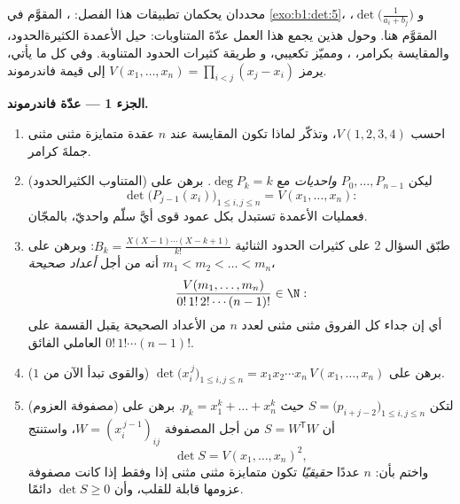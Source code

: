 \begin{problem}\label{pb:b1:det:1}
محددان يحكمان تطبيقات هذا الفصل: ، المقوَّم في \cref{exo:b1:det:5}، و
\emph{} $\det\bigl(\frac{1}{a_i +
b_j}\bigr)$، المقوَّم هنا. وحول هذين يجمع هذا العمل
عدّةَ المتناوبات: حيل الأعمدة الكثيرةالحدود، والمقايسة
بكرامر، ، ومميّز  تكعيبي، و
طريقة كثيرات الحدود المتناوبة. وفي كل ما يأتي، يرمز $V(x_1,
\dots, x_n) = \prod_{i < j}(x_j - x_i)$ إلى قيمة
فاندرموند.

\medskip
\noindent\textbf{الجزء 1 --- عدّة فاندرموند.}
\begin{enumerate}
  \item احسب $V(1, 2, 3, 4)$، وتذكّر لماذا تكون المقايسة عند
        $n$ عقدة متمايزة مثنى مثنى جملةَ كرامر.
  \item (المتناوب الكثيرالحدود) ليكن $P_0, \dots, P_{n-1}$
        \emph{واحديات} مع $\deg P_k = k$. برهن على
        \[
        \det\bigl(P_{j-1}(x_i)\bigr)_{1 \leq i, j \leq n}
        = V(x_1, \dots, x_n) :
        \]
        فعمليات الأعمدة تستبدل بكل عمود قوى أيَّ سلّم
        واحديّ، بالمجّان.
  \item طبّق السؤال 2 على كثيرات الحدود الثنائية $B_k =
        \frac{X(X-1)\cdots(X-k+1)}{k!}$: وبرهن على أنه من أجل
        \emph{أعداد صحيحة} $m_1 < m_2 < \dots < m_n$،
        \[
        \frac{V(m_1, \dots, m_n)}{0!\,1!\,2!\cdots(n-1)!}
        \in \N :
        \]
        أي إن جداء كل الفروق مثنى مثنى لعدد $n$ من الأعداد الصحيحة
        يقبل القسمة على العاملي الفائق $0!\,1!\cdots(n-1)!$.
  \item برهن على $\det\bigl(x_i^{\,j}\bigr)_{1 \leq i, j \leq n} =
        x_1 x_2 \cdots x_n\, V(x_1, \dots, x_n)$ (والقوى تبدأ
        الآن من $1$).
  \item (مصفوفة العزوم) لتكن $S = \bigl(p_{i+j-2}\bigr)_{1 \leq
        i, j \leq n}$ حيث $p_k = x_1^k + \dots + x_n^k$. برهن
        على أن $S = W^{\mathsf T} W$ من أجل المصفوفة $W =
        (x_i^{\,j-1})_{ij}$، واستنتج
        \[
        \det S = V(x_1, \dots, x_n)^2 ,
        \]
        واختم بأن: $n$ عددًا \emph{حقيقيًا} تكون متمايزة مثنى
        مثنى إذا وفقط إذا كانت مصفوفة عزومها
        قابلة للقلب، وأن $\det S \geq 0$ دائمًا.
\end{enumerate}


\end{problem}
